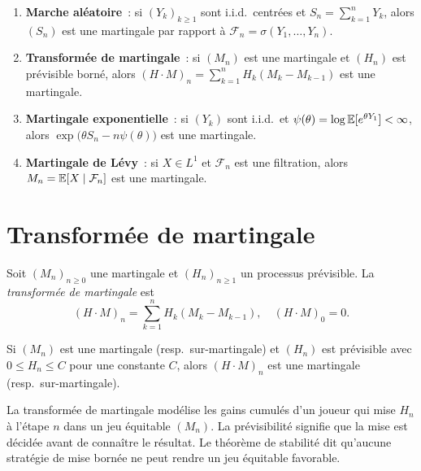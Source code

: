 \begin{exemple}
\begin{enumerate}
  \item \textbf{Marche al\'eatoire}~: si $(Y_k)_{k \geq 1}$ sont i.i.d.\ centr\'ees
    et $S_n = \sum_{k=1}^n Y_k$, alors $(S_n)$ est une martingale par rapport \`a
    $\mathcal{F}_n = \sigma(Y_1, \ldots, Y_n)$.
  \item \textbf{Transform\'ee de martingale}~: si $(M_n)$ est une martingale et $(H_n)$
    est pr\'evisible born\'e, alors $(H \cdot M)_n = \sum_{k=1}^n H_k (M_k - M_{k-1})$
    est une martingale.
  \item \textbf{Martingale exponentielle}~: si $(Y_k)$ sont i.i.d.\ et
    $\psi(\theta) = \log \mathbb{E}[e^{\theta Y_1}] < \infty$, alors
    $\exp\bigl(\theta S_n - n\psi(\theta)\bigr)$ est une martingale.
  \item \textbf{Martingale de L\'evy}~: si $X \in L^1$ et $\mathcal{F}_n$ est une
    filtration, alors $M_n = \mathbb{E}[X \mid \mathcal{F}_n]$ est une martingale.
\end{enumerate}
\end{exemple}

\section{Transform\'ee de martingale}

\begin{definition}
Soit $(M_n)_{n \geq 0}$ une martingale et $(H_n)_{n \geq 1}$ un processus
pr\'evisible. La \emph{transform\'ee de martingale} est
\[
  (H \cdot M)_n = \sum_{k=1}^{n} H_k (M_k - M_{k-1}), \quad (H \cdot M)_0 = 0.
\]
\end{definition}

\begin{theoreme}[Stabilit\'e]
Si $(M_n)$ est une martingale (resp.\ sur-martingale) et $(H_n)$ est pr\'evisible
avec $0 \leq H_n \leq C$ pour une constante $C$, alors $(H \cdot M)_n$ est une
martingale (resp.\ sur-martingale).
\end{theoreme}

\begin{intuition}[title=\textbf{Strat\'egie de jeu}]
La transform\'ee de martingale mod\'elise les gains cumul\'es d'un joueur qui mise
$H_n$ \`a l'\'etape $n$ dans un jeu \'equitable $(M_n)$. La pr\'evisibilit\'e signifie
que la mise est d\'ecid\'ee avant de conna\^itre le r\'esultat. Le th\'eor\`eme de
stabilit\'e dit qu'aucune strat\'egie de mise born\'ee ne peut rendre un jeu
\'equitable favorable.
\end{intuition}

